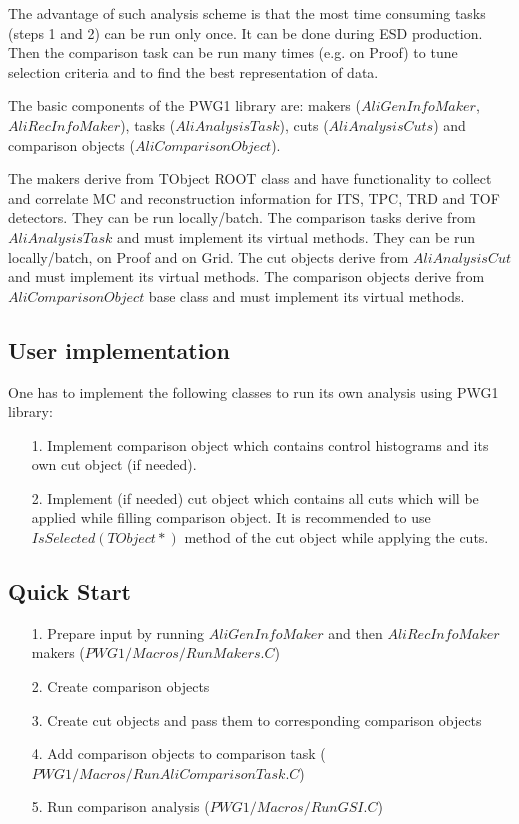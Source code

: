 \documentclass{elsart}
\begin{document}
The advantage of such analysis scheme is that the most time consuming
tasks (steps 1 and 2) can be run only once. It can be done during
ESD production. Then the comparison task can be run many times (e.g. on Proof) 
to tune selection criteria and to find the best representation of data. 

The basic components of the PWG1 library are: makers ($AliGenInfoMaker$, $AliRecInfoMaker$), 
tasks ($AliAnalysisTask$), cuts ($AliAnalysisCuts$) and comparison objects ($AliComparisonObject$). 

The makers derive from TObject ROOT class and have functionality to collect and correlate MC and reconstruction 
information for ITS, TPC, TRD and TOF detectors. They can be run locally/batch. The comparison tasks derive from $AliAnalysisTask$ and must implement its virtual methods. They can be run locally/batch, on Proof and on Grid. The cut objects derive from $AliAnalysisCut$ and must implement its virtual methods. The comparison objects derive from $AliComparisonObject$ base class and must implement its virtual methods.

\subsection{User implementation}

One has to implement the following classes to run its own analysis using PWG1 library:

\begin{itemize}
\item[1.] Implement comparison object which contains control histograms and its own cut object (if needed). 
\item[2.] Implement (if needed) cut object which contains all cuts which will be applied while filling comparison object. It is recommended to use $IsSelected(TObject*)$ method of the cut object while applying the cuts.
\end{itemize}
 
\subsection{Quick Start}
 
\begin{itemize}
\item[1.] Prepare input by running $AliGenInfoMaker$ and then $AliRecInfoMaker$ makers ($PWG1/Macros/RunMakers.C$)
\item[2.] Create comparison objects 
\item[3.] Create cut objects and pass them to corresponding comparison objects
\item[4.] Add comparison objects to comparison task \newline ($PWG1/Macros/RunAliComparisonTask.C$)
\item[5.] Run comparison analysis ($PWG1/Macros/RunGSI.C$)

\end{itemize}
 
\end{document}

